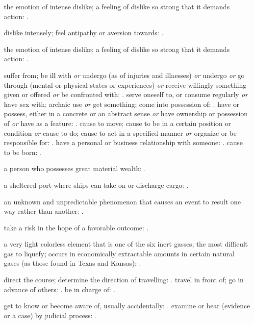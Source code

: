   the emotion of intense dislike; a feeling of dislike so strong that it demands action: .

  dislike intensely; feel antipathy or aversion towards: .

  the emotion of intense dislike; a feeling of dislike so strong that it demands action: .

  suffer from; be ill with \textit{or} undergo (as of injuries and illnesses) \textit{or} undergo \textit{or} go through (mental or physical states or experiences) \textit{or} receive willingly something given or offered \textit{or} be confronted with: . serve oneself to, or consume regularly \textit{or} have sex with; archaic use \textit{or} get something; come into possession of: . have or possess, either in a concrete or an abstract sense \textit{or} have ownership or possession of \textit{or} have as a feature: . cause to move; cause to be in a certain position or condition \textit{or} cause to do; cause to act in a specified manner \textit{or} organize or be responsible for: . have a personal or business relationship with someone: . cause to be born: .

  a person who possesses great material wealth: .

  a sheltered port where ships can take on or discharge cargo: .

  an unknown and unpredictable phenomenon that causes an event to result one way rather than another: .

  take a risk in the hope of a favorable outcome: .

  a very light colorless element that is one of the six inert gasses; the most difficult gas to liquefy; occurs in economically extractable amounts in certain natural gases (as those found in Texas and Kansas): .

  direct the course; determine the direction of travelling: . travel in front of; go in advance of others: . be in charge of: .

  get to know or become aware of, usually accidentally: . examine or hear (evidence or a case) by judicial process: .

